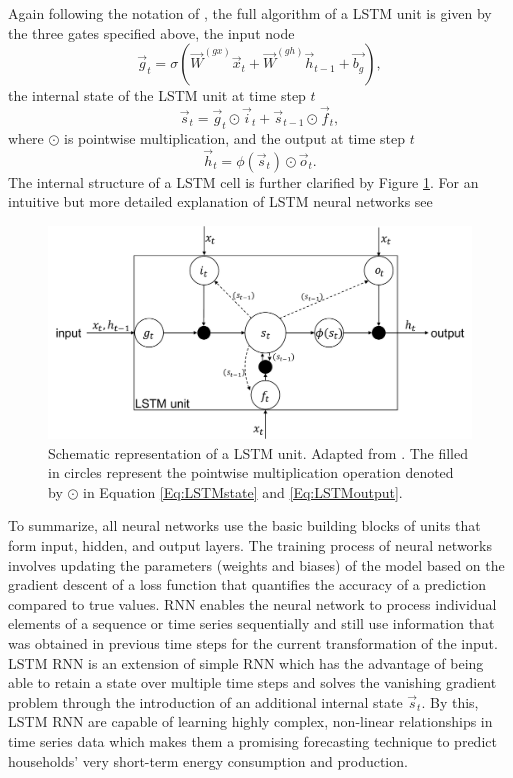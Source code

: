 Again following the notation of \citet{Lipton:2015}, the full algorithm of a LSTM unit is given by the three gates specified above, the input node
%
\begin{equation} \label{Eq:LSTMinput}
    \vec{g}_t=\sigma\left(\vec{W}^{(gx)}\vec{x}_t+\vec{W}^{(gh)}\vec{h}_{t-1}+\vec{b_g}\right),
\end{equation}
%
the internal state of the LSTM unit at time step $t$
%
\begin{equation} \label{Eq:LSTMstate}
    \vec{s}_t=\vec{g}_t\odot\vec{i}_t+\vec{s}_{t-1}\odot\vec{f}_t,
\end{equation}
%
where $\odot$ is pointwise multiplication, and the output at time step $t$
%
\begin{equation} \label{Eq:LSTMoutput}
    \vec{h}_t=\phi\left(\vec{s}_t\right)\odot\vec{o}_t.
\end{equation}
%
The internal structure of a LSTM cell is further clarified by Figure \ref{Fig:LSTMunit}. For an intuitive but more detailed explanation of LSTM neural networks see \citet[][Ch. 6.2]{chollet:2018}
%
\begin{figure}[htbp]
    \centering
    \includegraphics[scale=0.5]{thesis/figures/LSTMunit.pdf}
    \caption[Schematic representation of a LSTM unit]{Schematic representation of a LSTM unit. Adapted from \citet{Graves:2012}. The filled in circles represent the pointwise multiplication operation denoted by $\odot$ in Equation \ref{Eq:LSTMstate} and \ref{Eq:LSTMoutput}.}
    \label{Fig:LSTMunit}
\end{figure}

To summarize, all neural networks use the basic building blocks of units that form input, hidden, and output layers. The training process of neural networks involves updating the parameters (weights and biases) of the model based on the gradient descent of a loss function that quantifies the accuracy of a prediction compared to true values. RNN enables the neural network to process individual elements of a sequence or time series sequentially and still use information that was obtained in previous time steps for the current transformation of the input. LSTM RNN is an extension of simple RNN which has the advantage of being able to retain a state over multiple time steps and solves the vanishing gradient problem through the introduction of an additional internal state $\vec{s}_t$. By this, LSTM RNN are capable of learning highly complex, non-linear relationships in time series data which makes them a promising forecasting technique to predict households' very short-term energy consumption and production.



